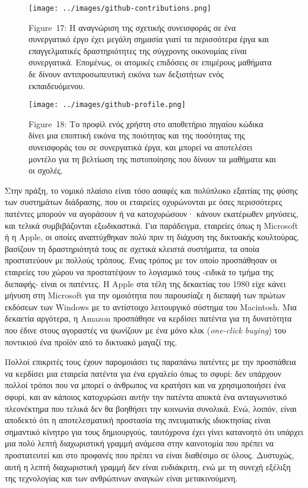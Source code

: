 \documentclass[
]{article}
\begin{document}
\leavevmode{}%
\begin{figure}
\hypertarget{fig:github-contributions}{%
\centering
\texttt{[image: ../images/github-contributions.png]}
\caption{Figure~17: Η αναγνώριση της σχετικής συνεισφοράς σε ένα
συνεργατικό έργο έχει μεγάλη σημασία γιατί τα περισσότερα έργα και
επαγγελματικές δραστηριότητες της σύγχρονης οικονομίας είναι
συνεργατικά. Eπομένως, οι ατομικές επιδόσεις σε επιμέρους μαθήματα δε
δίνουν αντιπροσωπευτική εικόνα των δεξιοτήτων ενός
εκπαιδευόμενου.}\label{fig:github-contributions}
}
\end{figure}

\leavevmode{}%
\begin{figure}
\hypertarget{fig:github-profile}{%
\centering
\texttt{[image: ../images/github-profile.png]}
\caption{Figure~18: Το προφίλ ενός χρήστη στο αποθετήριο πηγαίου κώδικα
δίνει μια εποπτική εικόνα της ποιότητας και της ποσότητας της
συνεισφοράς του σε συνεργατικά έργα, και μπορεί να αποτελέσει μοντέλο
για τη βελτίωση της πιστοποίησης που δίνουν τα μαθήματα και οι
σχολές.}\label{fig:github-profile}
}
\end{figure}

Στην πράξη, το νομικό πλαίσιο είναι τόσο ασαφές και πολύπλοκο εξαιτίας
της φύσης των συστημάτων διάδρασης, που οι εταιρείες οχυρώνονται με όσες
περισσότερες πατέντες μπορούν να αγοράσουν ή να κατοχυρώσουν· κάνουν
εκατέρωθεν μηνύσεις, και τελικά συμβιβάζονται εξωδικαστικά. Για
παράδειγμα, εταιρείες όπως η Microsoft ή η Apple, οι οποίες αναπτύχθηκαν
πολύ πριν τη διάχυση της δικτυακής κουλτούρας, βασίζουν τη δραστηριότητά
τους σε σχετικά κλειστά συστήματα, τα οποία προστατεύουν με πολλούς
τρόπους. Ένας τρόπος με τον οποίο προσπάθησαν οι εταιρείες του χώρου να
προστατέψουν το λογισμικό τους -ειδικά το τμήμα της διεπαφής- είναι οι
πατέντες. Η Apple στα τέλη της δεκαετίας του 1980 είχε κάνει μήνυση στη
Microsoft για την ομοιότητα που παρουσίαζε η διεπαφή των πρώτων εκδόσεων
των Windows με το αντίστοιχο λειτουργικό σύστημα του Macintosh. Μια
δεκαετία αργότερα, η Amazon προσπάθησε να κερδίσει πατέντα για τη
δυνατότητα που έδινε στους αγοραστές να ψωνίζουν με ένα μόνο κλικ
(\emph{one-click buying}) του ποντικιού ένα προϊόν από το δικτυακό
μαγαζί της.

Πολλοί επικριτές τους έχουν παρομοιάσει τις παραπάνω πατέντες με την
προσπάθεια να κερδίσει μια εταιρεία πατέντα για ένα εργαλείο όπως το
σφυρί: δεν υπάρχουν πολλοί τρόποι που να μπορεί ο άνθρωπος να κρατήσει
και να χρησιμοποιήσει ένα σφυρί, και αν κάποιος κατοχυρώσει αυτήν την
πατέντα αποκτά ένα ανταγωνιστικό πλεονέκτημα που τελικά δεν θα βοηθήσει
την κοινωνία συνολικά. Ενώ, λοιπόν, είναι αποδεκτό ότι η αποτελεσματική
προστασία της πνευματικής ιδιοκτησίας είναι σημαντικό κίνητρο για τους
δημιουργούς, ταυτόχρονα έχει γίνει κατανοητό ότι υπάρχει μια πολύ λεπτή
διαχωριστική γραμμή ανάμεσα στην καινοτομία που πρέπει να προστατευτεί
και στο προφανές που πρέπει να είναι διαθέσιμο σε όλους. Δυστυχώς, αυτή
η λεπτή διαχωριστική γραμμή δεν είναι ευδιάκριτη, ενώ με τη συνεχή
εξέλιξη της τεχνολογίας και των ανθρώπινων αναγκών είναι μετακινούμενη.
\end{document}
